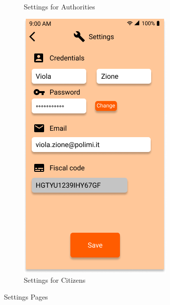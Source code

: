 \documentclass{article}
\begin{document}
\begin{figure}[H]
\begin{subfigure}{0.5\textwidth}
        \caption{Settings for Authorities}
        \label{fig:subim1}
    \end{subfigure}
    \begin{subfigure}{0.5\textwidth}
        \includegraphics[width=0.9\linewidth]{img/mockups/settings_citizen.png}
        \caption{Settings for Citizens}
        \label{fig:subim2}
    \end{subfigure}
    \caption{Settings Pages}
    \label{fig:image2}
\end{figure}

\clearpage
\end{document}
